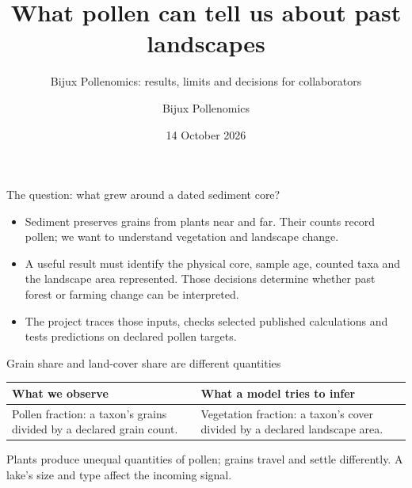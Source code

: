 
\title{What pollen can tell us about past landscapes}
\subtitle{Bijux Pollenomics: results, limits and decisions for collaborators}
\author{Bijux Pollenomics}
\date{14 October 2026}

\frame{\titlepage}

\begin{frame}{The question: what grew around a dated sediment core?}
\begin{itemize}
\item Sediment preserves grains from plants near and far. Their counts record pollen; we want to understand vegetation and landscape change.
\item A useful result must identify the physical core, sample age, counted taxa and the landscape area represented. Those decisions determine whether past forest or farming change can be interpreted.
\item The project traces those inputs, checks selected published calculations and tests predictions on declared pollen targets.
\end{itemize}
\end{frame}

\begin{frame}{Grain share and land-cover share are different quantities}
\begin{center}
\begin{tabular}{p{.40\linewidth}p{.47\linewidth}}
\toprule
What we observe & What a model tries to infer \\
\midrule
Pollen fraction: a taxon's grains divided by a declared grain count. & Vegetation fraction: a taxon's cover divided by a declared landscape area. \\
\bottomrule
\end{tabular}
\end{center}
Plants produce unequal quantities of pollen; grains travel and settle differently. A lake's size and type affect the incoming signal.
\end{frame}

